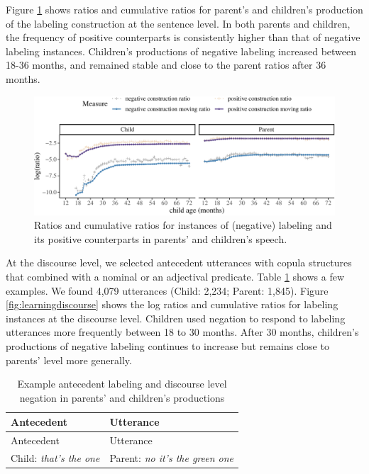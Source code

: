 \documentclass[
  english,
  man,floatsintext]{apa6}
\begin{document}
Figure \ref{fig:learning} shows ratios and cumulative ratios for parent's and children's production of the labeling construction at the sentence level. In both parents and children, the frequency of positive counterparts is consistently higher than that of negative labeling instances. Children's productions of negative labeling increased between 18-36 months, and remained stable and close to the parent ratios after 36 months.

\begin{figure}[H]

{\centering \includegraphics{neg_construction_article_files/figure-latex/learning-1} 

}

\caption{Ratios and cumulative ratios for instances of (negative) labeling and its positive counterparts in parents' and children's speech.}\label{fig:learning}
\end{figure}

At the discourse level, we selected antecedent utterances with copula structures that combined with a nominal or an adjectival predicate. Table \ref{tab:dislabel} shows a few examples. We found 4,079 utterances (Child: 2,234; Parent: 1,845). Figure \ref{fig:learningdiscourse} shows the log ratios and cumulative ratios for labeling instances at the discourse level. Children used negation to respond to labeling utterances more frequently between 18 to 30 months. After 30 months, children's productions of negative labeling continues to increase but remains close to parents' level more generally.

\begin{longtable}[]{@{}ll@{}}
\caption{\label{tab:dislabel} Example antecedent labeling and discourse level negation in parents' and children's productions}\tabularnewline
\toprule
Antecedent & Utterance \\
\midrule
\endfirsthead
\toprule
Antecedent & Utterance \\
\midrule
\endhead
Child: \emph{that's the one} & Parent: \emph{no it's the green one} \\
\bottomrule
\end{longtable}
\end{document}
